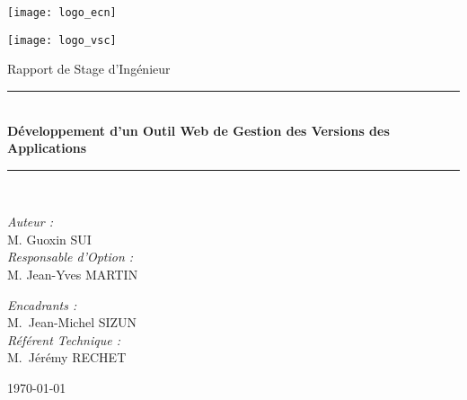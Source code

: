 \begin{titlepage}

 \noindent
 \begin{minipage}{0.3\textwidth}
  \begin{flushleft} \large
   \texttt{[image: logo\_ecn]}\\[1cm]
  \end{flushleft}
 \end{minipage}%
 \hfill
 \begin{minipage}{0.3\textwidth}
  \begin{flushright} \large
   \texttt{[image: logo\_vsc]}\\[1cm]
  \end{flushright}
 \end{minipage}

 \begin{center}
  \vskip 2cm

   {\large Rapport de Stage d'Ingénieur}\\[0.5cm]

  \rule{\linewidth}{0.5mm} \\[0.4cm]
  { \huge \bfseries Développement d’un Outil Web de Gestion des Versions des Applications \\[0.4cm] }
  \rule{\linewidth}{0.5mm} \\[1.5cm]

  \noindent
  \begin{minipage}{0.4\textwidth}
   \begin{flushleft} \large
    \emph{Auteur :}\\
    M. Guoxin \textsc{SUI}\\
    \bigbreak
    \emph{Responsable d'Option :}\\
    M. Jean-Yves \textsc{MARTIN}\\
   \end{flushleft}
  \end{minipage}%
  \hfill
  \begin{minipage}{0.4\textwidth}
   \begin{flushright} \large
    \emph{Encadrants :} \\
    M.~Jean-Michel \textsc{SIZUN}\\
    \bigbreak
    \emph{Référent Technique :}\\
    M.~Jérémy \textsc{RECHET}
   \end{flushright}
  \end{minipage}

  \vfill

  {\large \today}

 \end{center}
\end{titlepage}
